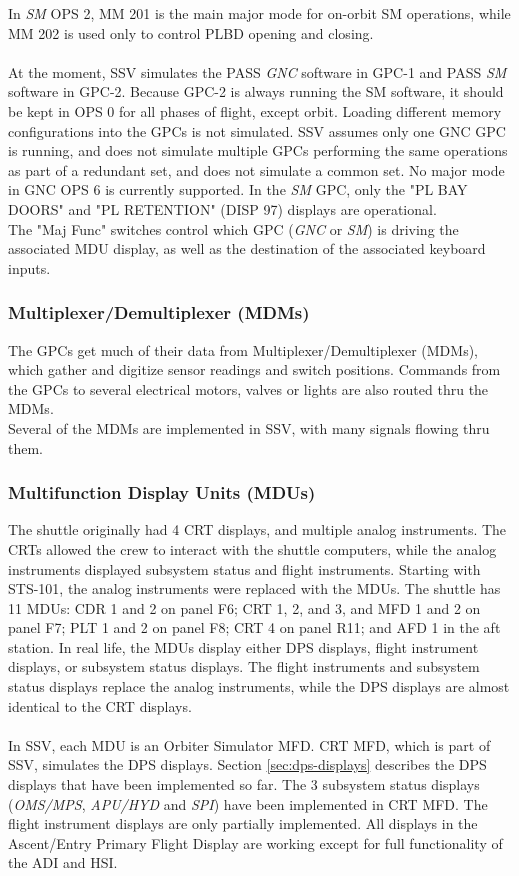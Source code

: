\documentclass[Space_Shuttle_Vessel_Manual.tex]{subfiles}
\begin{document}
\begin{multicols*}{2}
In \textit{SM} OPS 2, MM 201 is the main major mode for on-orbit SM operations, while MM 202 is used only to control PLBD opening and closing.\\
\\
At the moment, SSV simulates the PASS \textit{GNC} software in GPC-1 and PASS \textit{SM} software in GPC-2. Because GPC-2 is always running the SM software, it should be kept in OPS 0 for all phases of flight, except orbit. Loading different memory configurations into the GPCs is not simulated. SSV assumes only one GNC GPC is running, and does not simulate multiple GPCs performing the same operations as part of a redundant set, and does not simulate a common set. No major mode in GNC OPS 6 is currently supported. In the \textit{SM} GPC, only the "PL BAY DOORS" and "PL RETENTION" (DISP 97) displays are operational.\\
The "Maj Func" switches control which GPC (\textit{GNC} or \textit{SM}) is driving the associated MDU display, as well as the destination of the associated keyboard inputs.

\subsubsection{Multiplexer/Demultiplexer (MDMs)}
The GPCs get much of their data from Multiplexer/Demultiplexer (MDMs), which gather and digitize sensor readings and switch positions. Commands from the GPCs to several electrical motors, valves or lights are also routed thru the MDMs.\\
Several of the MDMs are implemented in SSV, with many signals flowing thru them.


\subsubsection{Multifunction Display Units (MDUs)}
The shuttle originally had 4 CRT displays, and multiple analog instruments.
The CRTs allowed the crew to interact with the shuttle computers, while the analog instruments displayed subsystem status and flight instruments.
Starting with STS-101, the analog instruments were replaced with the MDUs.
The shuttle has 11 MDUs: CDR 1 and 2 on panel F6; CRT 1, 2, and 3, and MFD 1 and 2 on panel F7; PLT 1 and 2 on panel F8; CRT 4 on panel R11; and AFD 1 in the aft station.
In real life, the MDUs display either DPS displays, flight instrument displays, or subsystem status displays.
The flight instruments and subsystem status displays replace the analog instruments, while the DPS displays are almost identical to the CRT displays.\\
\\
In SSV, each MDU is an Orbiter Simulator MFD. CRT MFD, which is part of SSV, simulates the DPS displays. Section \ref{sec:dps-displays} describes the DPS displays that have been implemented so far.
The 3 subsystem status displays (\textit{OMS/MPS}, \textit{APU/HYD} and \textit{SPI}) have been implemented in CRT MFD.
The flight instrument displays are only partially implemented. All displays in the Ascent/Entry Primary Flight Display are working except for full functionality of the ADI and HSI.
\end{multicols*}
\end{document}

